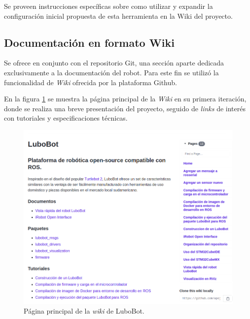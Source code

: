 
Se proveen instrucciones específicas sobre como utilizar y expandir la configuración inicial propuesta de esta herramienta en la Wiki del proyecto.

\subsection{Documentación en formato Wiki}

Se ofrece en conjunto con el repositorio Git\protect\footnotemark, una sección aparte dedicada exclusivamente a la documentación del robot. Para este fin se utilizó la funcionalidad de \textit{Wiki} ofrecida por la plataforma Github.



En la figura \ref{fig:wiki} se muestra la página principal de la \textit{Wiki} en su primera iteración, donde se realiza una breve presentación del proyecto, seguido de \textit{links} de interés con tutoriales y especificaciones técnicas.

\begin{figure}[ht]
  \centering
  \includegraphics[scale=0.4]{./Figures/wiki.png}
  \caption{Página principal de la \textit{wiki} de LuboBot.\protect\footnotemark}
  \label{fig:wiki}
\end{figure}


